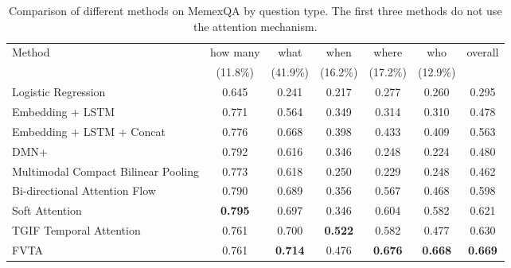 \begin{table*}[]
\centering
\begin{tabular}{l||c|c|c|c|c|c}
\hline
Method            & how many & what & when & where  & who  & overall \\ 
&(11.8\%)  & (41.9\%)& (16.2\%)  &(17.2\%)&(12.9\%)&
\\\hline \hline
Logistic Regression             & 0.645 & 0.241 & 0.217 & 0.277 & 0.260 & 0.295 \\
Embedding + LSTM             & 0.771 & 0.564& 0.349& 0.314& 0.310& 0.478 \\
Embedding + LSTM + Concat            & 0.776 &	0.668& 	0.398& 	0.433	& 0.409	& 0.563 \\
\hline
DMN+  \cite{xiong2016dynamic}        & 0.792 & 0.616 & 0.346 & 0.248 & 0.224 & 0.480 \\
Multimodal Compact Bilinear Pooling \cite{fukui2016multimodal}& 0.773 & 0.618 & 0.250 & 0.229 & 0.248 & 0.462 \\


Bi-directional Attention Flow    \cite{seo2016bidirectional}    &0.790 & 0.689 & 0.356 & 0.567 & 0.468 & 0.598\\
Soft Attention          &  \textbf{0.795} & 0.697 & 0.346 & 0.604 & 0.582 & 0.621 \\
TGIF Temporal Attention   \cite{jang2017tgif}       & 0.761 & 0.700 & \textbf{0.522} & 0.582 & 0.477 & 0.630 \\
FVTA          &  0.761 & \textbf{0.714} & 0.476 & \textbf{0.676} & \textbf{0.668} & \textbf{0.669} \\
 \hline
\end{tabular}
\vspace{1mm}
\caption{Comparison of different methods on MemexQA by question type. The first three methods do not use the attention mechanism.}
\label{exp-mem}
\vspace{-4mm}
\end{table*}






























